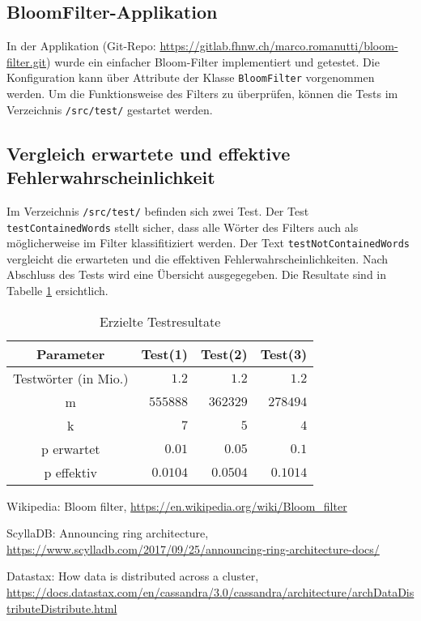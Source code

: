 \documentclass[10pt, a4paper, twocolumn]{article} %
\begin{document}
\subsection{BloomFilter-Applikation}

In der Applikation (Git-Repo: \url{https://gitlab.fhnw.ch/marco.romanutti/bloom-filter.git}) wurde ein einfacher Bloom-Filter implementiert und getestet.
Die Konfiguration kann über Attribute der Klasse \texttt{BloomFilter} vorgenommen werden.
Um die Funktionsweise des Filters zu überprüfen, können die Tests im Verzeichnis \texttt{/src/test/} gestartet werden.

\subsection{Vergleich erwartete und effektive Fehlerwahrscheinlichkeit}

Im Verzeichnis \texttt{/src/test/} befinden sich zwei Test.
Der Test \texttt{testContainedWords} stellt sicher, dass alle Wörter des Filters auch als möglicherweise im Filter klassifitiziert werden.
Der Text \texttt{testNotContainedWords} vergleicht die erwarteten und die effektiven Fehlerwahrscheinlichkeiten.
Nach Abschluss des Tests wird eine Übersicht ausgegegeben.
Die Resultate sind in Tabelle \ref{tests} ersichtlich.

\begin{table}[h]
	\caption{Erzielte Testresultate}
	\label{tests}
	\centering
	\begin{tabular}{crrr}
		\toprule
		\cmidrule(r){1-2}
		Parameter & Test(1) & Test(2) & Test(3) \\
		\midrule
		Testwörter (in Mio.) & $1.2$ & $1.2$ & $1.2$ \\
		m & $555888$ & $362329$ & $278494$ \\
		k & $7$ & $5$ & $4$ \\
		p erwartet & $0.01$ & $0.05$ & $0.1$ \\
		p effektiv & $0.0104$ & $0.0504$ & $0.1014$ \\
		\bottomrule
	\end{tabular}
\end{table}


\begin{thebibliography}{9}
	Wikipedia: Bloom filter,
	\url{https://en.wikipedia.org/wiki/Bloom\_filter}

	ScyllaDB: Announcing ring architecture,
	\url{https://www.scylladb.com/2017/09/25/announcing-ring-architecture-docs/}

	Datastax: How data is distributed across a cluster,
	\url{https://docs.datastax.com/en/cassandra/3.0/cassandra/architecture/archDataDistributeDistribute.html}
\end{thebibliography}
\end{document}
